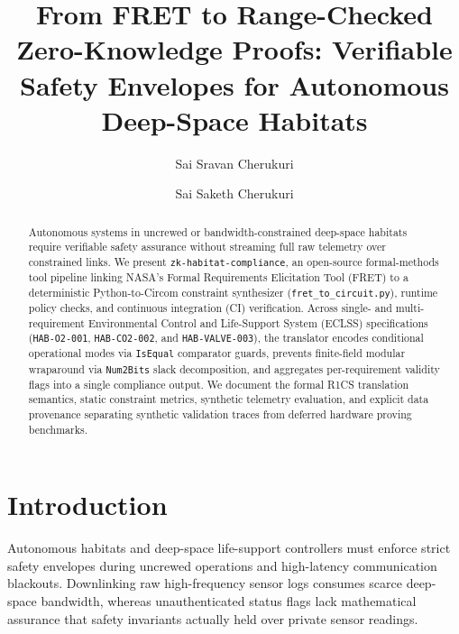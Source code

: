 \documentclass[runningheads]{llncs}
\begin{document}
\title{From FRET to Range-Checked Zero-Knowledge Proofs: Verifiable Safety Envelopes for Autonomous Deep-Space Habitats}

\author{Sai Sravan Cherukuri \and Sai Saketh Cherukuri}

\maketitle

\begin{abstract}
Autonomous systems in uncrewed or bandwidth-constrained deep-space habitats require verifiable safety assurance without streaming full raw telemetry over constrained links. We present \texttt{zk-habitat-compliance}, an open-source formal-methods tool pipeline linking NASA's Formal Requirements Elicitation Tool (FRET) to a deterministic Python-to-Circom constraint synthesizer (\texttt{fret\_to\_circuit.py}), runtime policy checks, and continuous integration (CI) verification. Across single- and multi-requirement Environmental Control and Life-Support System (ECLSS) specifications (\texttt{HAB-O2-001}, \texttt{HAB-CO2-002}, and \texttt{HAB-VALVE-003}), the translator encodes conditional operational modes via \texttt{IsEqual} comparator guards, prevents finite-field modular wraparound via \texttt{Num2Bits} slack decomposition, and aggregates per-requirement validity flags into a single compliance output. We document the formal R1CS translation semantics, static constraint metrics, synthetic telemetry evaluation, and explicit data provenance separating synthetic validation traces from deferred hardware proving benchmarks.
\end{abstract}


\section{Introduction}
Autonomous habitats and deep-space life-support controllers must enforce strict safety envelopes during uncrewed operations and high-latency communication blackouts. Downlinking raw high-frequency sensor logs consumes scarce deep-space bandwidth, whereas unauthenticated status flags lack mathematical assurance that safety invariants actually held over private sensor readings.
\end{document}
